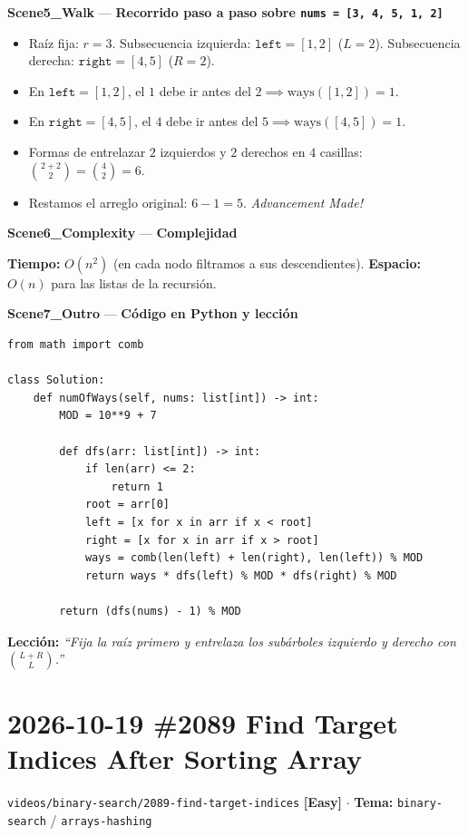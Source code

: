 \documentclass[letterpaper,10pt]{article}
\newcommand{\scene}[2]{\noindent\textbf{\textcolor{mcaqua}{#1}} --- \textbf{#2}\par\vspace{1pt}}
\newcommand{\folder}[1]{\texttt{\textcolor{mcgreen}{#1}}}
\newcommand{\badge}[2]{\textbf{\textcolor{#1}{[#2]}}}
\begin{document}
\begin{shaded}
\scene{Scene5\_Walk}{Recorrido paso a paso sobre \texttt{nums = [3, 4, 5, 1, 2]}}
\begin{itemize}\setlength{\itemsep}{1pt}
  \item Ra\'iz fija: $r = 3$. Subsecuencia izquierda: $\texttt{left} = [1, 2]$ ($L = 2$). Subsecuencia derecha: $\texttt{right} = [4, 5]$ ($R = 2$).
  \item En $\texttt{left} = [1, 2]$, el $1$ debe ir antes del $2 \implies \text{ways}([1, 2]) = 1$.
  \item En $\texttt{right} = [4, 5]$, el $4$ debe ir antes del $5 \implies \text{ways}([4, 5]) = 1$.
  \item Formas de entrelazar $2$ izquierdos y $2$ derechos en $4$ casillas: $\binom{2+2}{2} = \binom{4}{2} = 6$.
  \item Restamos el arreglo original: $6 - 1 = 5$. \textit{Advancement Made!}
\end{itemize}

\scene{Scene6\_Complexity}{Complejidad}
\textbf{Tiempo:} $O(n^2)$ (en cada nodo filtramos a sus descendientes). \quad \textbf{Espacio:} $O(n)$ para las listas de la recursi\'on.
\end{shaded}

\scene{Scene7\_Outro}{C\'odigo en Python y lecci\'on}
\begin{Verbatim}[frame=single,fontsize=\small]
from math import comb

class Solution:
    def numOfWays(self, nums: list[int]) -> int:
        MOD = 10**9 + 7

        def dfs(arr: list[int]) -> int:
            if len(arr) <= 2:
                return 1
            root = arr[0]
            left = [x for x in arr if x < root]
            right = [x for x in arr if x > root]
            ways = comb(len(left) + len(right), len(left)) % MOD
            return ways * dfs(left) % MOD * dfs(right) % MOD

        return (dfs(nums) - 1) % MOD
\end{Verbatim}
\textbf{Lecci\'on:} \textit{``Fija la ra\'iz primero y entrelaza los sub\'arboles izquierdo y derecho con $\binom{L+R}{L}$.''}

\newpage

\section{2026-10-19 \textbar{} \#2089 Find Target Indices After Sorting Array}
\folder{videos/binary-search/2089-find-target-indices} \hfill \badge{mcgreen}{Easy} $\cdot$ \textbf{Tema:} \texttt{binary-search} / \texttt{arrays-hashing}
\end{document}
